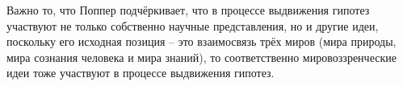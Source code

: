 \documentclass[exam_answers.tex]{subfiles}
\begin{document}
Важно то, что Поппер подчёркивает, что в процессе выдвижения гипотез участвуют не только собственно научные представления, но и другие идеи, поскольку его исходная позиция – это взаимосвязь трёх миров (мира природы, мира сознания человека и мира знаний), то соответственно мировоззренческие идеи тоже участвуют в процессе выдвижения гипотез.
\end{document}
